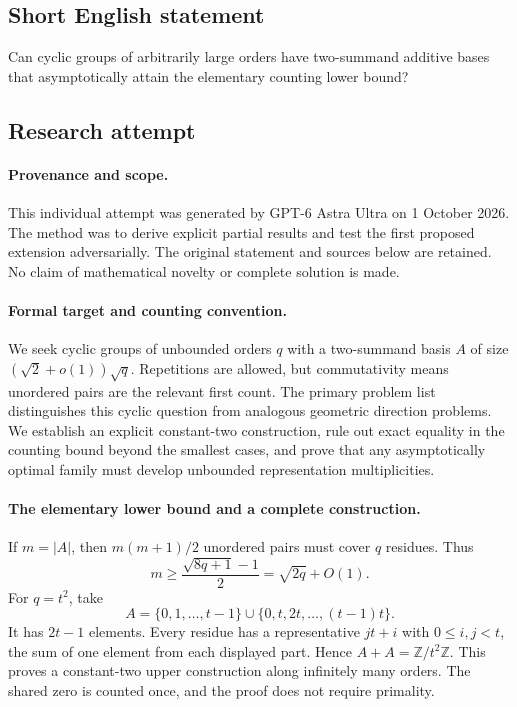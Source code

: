 \documentclass[11pt,a4paper]{article}
\newcommand{\Z}{\mathbb{Z}}
\begin{document}
\subsection{Short English statement}

Can cyclic groups of arbitrarily large orders have two-summand additive bases that asymptotically attain the elementary counting lower bound?

\subsection{Research attempt}

\paragraph{Provenance and scope.}
This individual attempt was generated by GPT-6 Astra Ultra on 1 October 2026. The method was to derive explicit partial results and test the first proposed extension adversarially. The original statement and sources below are retained. No claim of mathematical novelty or complete solution is made.

\paragraph{Formal target and counting convention.}
We seek cyclic groups of unbounded orders $q$ with a two-summand basis $A$ of size $(\sqrt2+o(1))\sqrt q$. Repetitions are allowed, but commutativity means unordered pairs are the relevant first count. The primary problem list distinguishes this cyclic question from analogous geometric direction problems. We establish an explicit constant-two construction, rule out exact equality in the counting bound beyond the smallest cases, and prove that any asymptotically optimal family must develop unbounded representation multiplicities.

\paragraph{The elementary lower bound and a complete construction.}
If $m=|A|$, then $m(m+1)/2$ unordered pairs must cover $q$ residues. Thus
\[
 m\geq\frac{\sqrt{8q+1}-1}{2}=\sqrt{2q}+O(1).
\]
For $q=t^2$, take
\[
 A=\{0,1,\ldots,t-1\}\cup\{0,t,2t,\ldots,(t-1)t\}.
\]
It has $2t-1$ elements. Every residue has a representative $jt+i$ with $0\leq i,j<t$, the sum of one element from each displayed part. Hence $A+A=\Z/t^2\Z$. This proves a constant-two upper construction along infinitely many orders. The shared zero is counted once, and the proof does not require primality.
\end{document}
